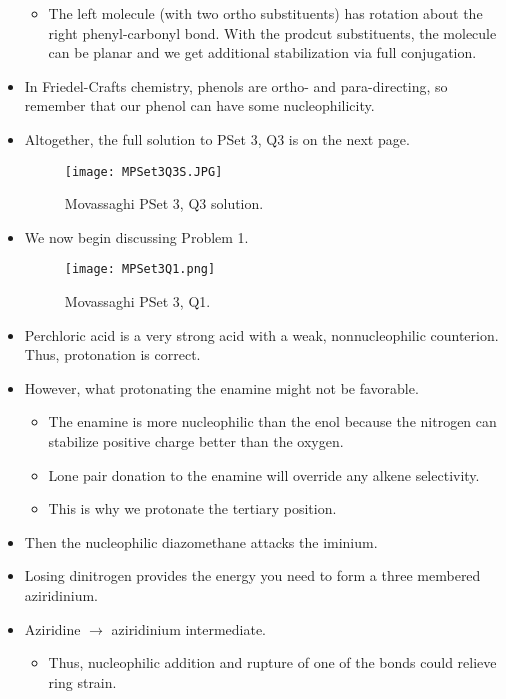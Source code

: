 \documentclass[../notes.tex]{subfiles}
\begin{document}
\begin{itemize}
    \begin{itemize}
        \item The left molecule (with two ortho substituents) has rotation about the right phenyl-carbonyl bond. With the prodcut substituents, the molecule can be planar and we get additional stabilization via full conjugation.
    \end{itemize}
    \item In Friedel-Crafts chemistry, phenols are ortho- and para-directing, so remember that our phenol can have some nucleophilicity.
    \item Altogether, the full solution to PSet 3, Q3 is on the next page.
    \begin{figure}[h!]
        \centering
        \texttt{[image: MPSet3Q3S.JPG]}
        \caption{Movassaghi PSet 3, Q3 solution.}
        \label{fig:MPSet3Q3S}
    \end{figure}
    \pagebreak
    \item We now begin discussing Problem 1.
    \begin{figure}[h!]
        \centering
        \texttt{[image: MPSet3Q1.png]}
        \caption{Movassaghi PSet 3, Q1.}
        \label{fig:MPSet3Q1}
    \end{figure}
    \item Perchloric acid is a very strong acid with a weak, nonnucleophilic counterion. Thus, protonation is correct.
    \item However, what protonating the enamine might not be favorable.
    \begin{itemize}
        \item The enamine is more nucleophilic than the enol because the nitrogen can stabilize positive charge better than the oxygen.
        \item Lone pair donation to the enamine will override any alkene selectivity.
        \item This is why we protonate the tertiary position.
    \end{itemize}
    \item Then the nucleophilic diazomethane attacks the iminium.
    \item Losing dinitrogen provides the energy you need to form a three membered aziridinium.
    \item Aziridine $\to$ aziridinium intermediate.
    \begin{itemize}
        \item Thus, nucleophilic addition and rupture of one of the bonds could relieve ring strain.

\end{itemize}
\end{itemize}
\end{document}
